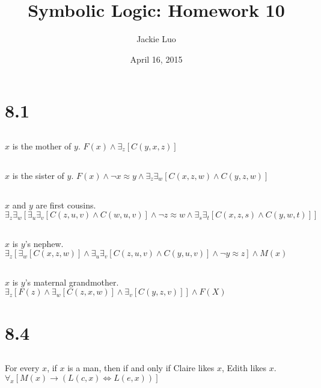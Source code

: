 \documentclass{article}
\title{Symbolic Logic: Homework 10}
\author{Jackie Luo}
\date{April 16, 2015}
\begin{document}
\maketitle

\section{8.1}
\subsection{}
$x$ is the mother of $y$.
\newline
$F(x) \wedge \exists_z[C(y, x, z)]$
\newline

\subsection{}
$x$ is the sister of $y$.
\newline
$F(x) \wedge \neg x \approx y \wedge \exists_z \exists_w[C(x, z, w) \wedge C(y, z, w)]$

\subsection{}
$x$ and $y$ are first cousins.
\newline
$\exists_z \exists_w[\exists_u \exists_v[C(z, u, v) \wedge C(w, u, v)] \wedge \neg z \approx w \wedge \exists_s \exists_t[C(x, z, s) \wedge C(y, w, t)]]$

\subsection{}
$x$ is $y$'s nephew.
\newline
$\exists_z[\exists_w[C(x, z, w)] \wedge \exists_u \exists_v[C(z, u, v) \wedge C(y, u, v)] \wedge \neg y \approx z] \wedge M(x)$

\subsection{}
$x$ is $y$'s maternal grandmother.
\newline
$\exists_z[F(z) \wedge \exists_w[C(z, x, w)] \wedge \exists_v[C(y, z, v)]] \wedge F(X)$

\section{8.4}
\subsection{}
For every $x$, if $x$ is a man, then if and only if Claire likes $x$, Edith likes $x$.
\newline
$\forall_x[M(x) \to (L(c, x) \iff L(e, x))]$
\end{document}
